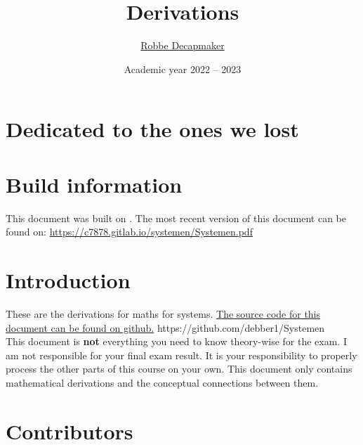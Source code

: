 \documentclass[a4paper,kul]{kulakarticle} %
\date{Academic year 2022 -- 2023}
\title{Derivations}
\author{\href{https://github.com/debber1}{Robbe Decapmaker}}
\begin{document}
\maketitle
\section*{Dedicated to the ones we lost}
\section*{Build information}
This document was built on \DTMNow.
\newline
The most recent version of this document can be found on: \href{https://c7878.gitlab.io/systemen/Systemen.pdf}{https://c7878.gitlab.io/systemen/Systemen.pdf}
\section*{Introduction}

These are the derivations for maths for systems. \href{https://github.com/debber1/Systemen}{The source code for this document can be found on github.} 
https://github.com/debber1/Systemen\\
\newline
This document is \textbf{not} everything you need to know theory-wise for the exam. I am not responsible for your final exam result. It is your responsibility to properly process the other parts of this course on your own.  This document only contains mathematical derivations and the conceptual connections between them.\\

\section*{Contributors}


\newpage

\newpage

\newpage

\newpage

\newpage

\end{document}
